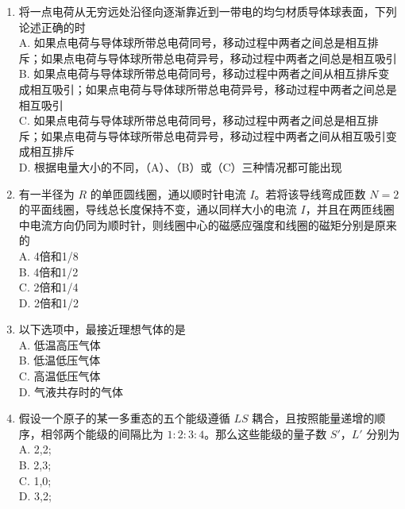 \begin{enumerate}
\item 将一点电荷从无穷远处沿径向逐渐靠近到一带电的均匀材质导体球表面，下列论述正确的时\\
A. 如果点电荷与导体球所带总电荷同号，移动过程中两者之间总是相互排斥；如果点电荷与导体球所带总电荷异号，移动过程中两者之间总是相互吸引\\
B. 如果点电荷与导体球所带总电荷同号，移动过程中两者之间从相互排斥变成相互吸引；如果点电荷与导体球所带总电荷异号，移动过程中两者之间总是相互吸引\\
C. 如果点电荷与导体球所带总电荷同号，移动过程中两者之间总是相互排斥；如果点电荷与导体球所带总电荷异号，移动过程中两者之间从相互吸引变成相互排斥\\
D. 根据电量大小的不同，（A）、（B）或（C）三种情况都可能出现\\

\item 有一半径为 $R$ 的单匝圆线圈，通以顺时针电流 $I$。若将该导线弯成匝数 $N=2$ 的平面线圈，导线总长度保持不变，通以同样大小的电流 $I$，并且在两匝线圈中电流方向仍同为顺时针，则线圈中心的磁感应强度和线圈的磁矩分别是原来的\\
A. 4倍和1/8\\
B. 4倍和1/2\\
C. 2倍和1/4\\
D. 2倍和1/2\\

\item 以下选项中，最接近理想气体的是\\
A. 低温高压气体\\
B. 低温低压气体\\
C. 高温低压气体\\
D. 气液共存时的气体\\

\item 假设一个原子的某一多重态的五个能级遵循 $LS$ 耦合，且按照能量递增的顺序，相邻两个能级的间隔比为 $1:2:3:4$。那么这些能级的量子数 $S'$，$L'$ 分别为\\
A. 2,2;\\
B. 2,3;\\
C. 1,0;\\
D. 3,2;\\
\end{enumerate}
